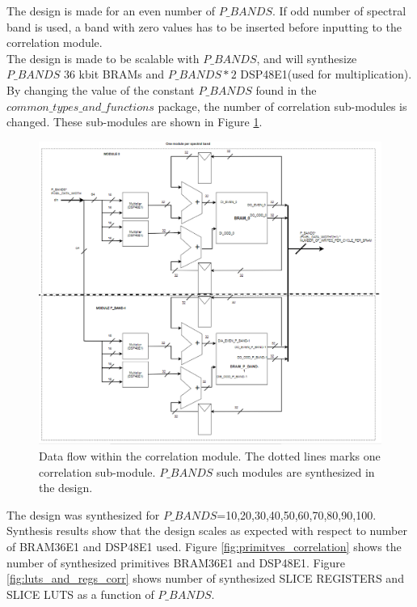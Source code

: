 The design is made for an even number of $P\_BANDS$. If odd number of spectral band is used, a band with zero values has to be inserted before inputting to the correlation module.\\

The design is made to be scalable with $P\_BANDS$, and will synthesize $P\_BANDS$ 36 kbit BRAMs and $P\_BANDS * 2$ DSP48E1(used for multiplication). By changing the value of the constant $P\_BANDS$ found in the $common\_types\_and\_functions$ package, the number of correlation sub-modules is changed. These sub-modules are shown in Figure \ref{fig:data_flow_correlation}. 
\begin{figure}[H]
\centering
   \includegraphics[scale=0.6]{images/correlation_data_path_with_adders.PNG}
  \caption{Data flow within the correlation module. The dotted lines marks one correlation sub-module. $P\_BANDS$ such modules are synthesized in the design. } 
  \label{fig:data_flow_correlation}
\end{figure}

The design was synthesized for $P\_BANDS$=10,20,30,40,50,60,70,80,90,100. Synthesis results show that the design scales as expected with respect to number of BRAM36E1 and DSP48E1 used. Figure \ref{fig:primitves_correlation}  shows the number of synthesized primitives  BRAM36E1 and DSP48E1. Figure \ref{fig:luts_and_regs_corr} shows number of synthesized SLICE REGISTERS and SLICE LUTS as a function of $P\_BANDS$.

